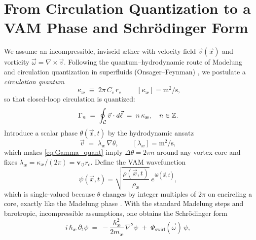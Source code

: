 \documentclass[a4paper,12pt]{article}
\begin{document}

    \section{From Circulation Quantization to a VAM Phase and Schrödinger Form}
    \label{sec:circulation_to_phase}

    We assume an incompressible, inviscid æther with velocity field $\vec v(\vec x)$ and vorticity $\vec\omega=\nabla\times\vec v$. Following the quantum–hydrodynamic route of Madelung \cite{Madelung1927} and circulation quantization in superfluids (Onsager--Feynman) \cite{Onsager1949,Feynman1955}, we postulate a \emph{circulation quantum}
    \begin{equation}
        \boxed{\;\kappa_\text{\ae}\;\equiv\;2\pi\,C_e\,r_c\;}\qquad [\kappa_\text{\ae}] = \text{m}^2/\text{s},
        \label{eq:kappa_def}
    \end{equation}
    so that closed-loop circulation is quantized:
    \begin{equation}
        \Gamma_n \;=\; \oint_{\cal C} \vec v \cdot d\vec\ell \;=\; n\,\kappa_\text{\ae},\quad n\in\mathbb Z.
        \label{eq:Gamma_quant}
    \end{equation}
    Introduce a scalar phase $\theta(\vec x,t)$ by the hydrodynamic ansatz
    \begin{equation}
        \vec v \;=\; \lambda_\text{\ae}\,\nabla\theta,\qquad [\lambda_\text{\ae}] = \text{m}^2/\text{s},
    \end{equation}
    which makes \eqref{eq:Gamma_quant} imply $\Delta\theta=2\pi n$ around any vortex core and fixes $\lambda_\text{\ae}=\kappa_\text{\ae}/(2\pi)=\mathbf{v}_{\scriptscriptstyle\boldsymbol{\circlearrowleft}} r_c$. Define the VAM wavefunction
    \begin{equation}
        \psi(\vec x,t)=\sqrt{\frac{\rho(\vec x,t)}{\rho_\text{\ae}}}\;e^{i\theta(\vec x,t)},
    \end{equation}
    which is single-valued because $\theta$ changes by integer multiples of $2\pi$ on encircling a core, exactly like the Madelung phase \cite{Madelung1927}. With the standard Madelung steps and barotropic, incompressible assumptions, one obtains the Schrödinger form
    \begin{equation}
        i\,\hbar_\text{\ae}\,\partial_t \psi \;=\; -\frac{\hbar_\text{\ae}^2}{2m_\text{\ae}}\,\nabla^2\psi \;+\; \Phi_\text{swirl}(\vec\omega)\,\psi,
        \label{eq:schrod_ae}
    \end{equation}
\end{document}

